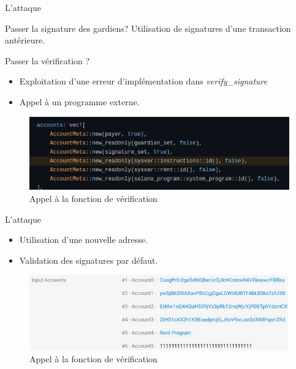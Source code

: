 \begin{frame}{L'attaque}
    \begin{block}{Passer la signature des gardiens?}
        Utilisation de signatures d'une transaction antérieure.
    \end{block}
    \begin{block}{Passer la vérification ?}
        \begin{itemize}
            \item Exploitation d'une erreur d'implémentation dans \textit{verify\_signature}
            \item Appel à un programme externe.
        \end{itemize}
        \begin{figure}
            \centering
            \includegraphics[scale = 0.3]{centralisation/img/sysvar_atk.png}
            \caption{Appel à la fonction de vérification}
        \end{figure}
    \end{block}
\end{frame}

\begin{frame}{L'attaque}
    \begin{itemize}
        \item Utilisation d'une nouvelle adresse.
        \item Validation des signatures par défaut.
    \end{itemize}
    \begin{figure}
        \centering
        \includegraphics[scale = 0.3]{centralisation/img/sysvar_transaction.png}
        \caption{Appel à la fonction de vérification}
    \end{figure}
\end{frame}

